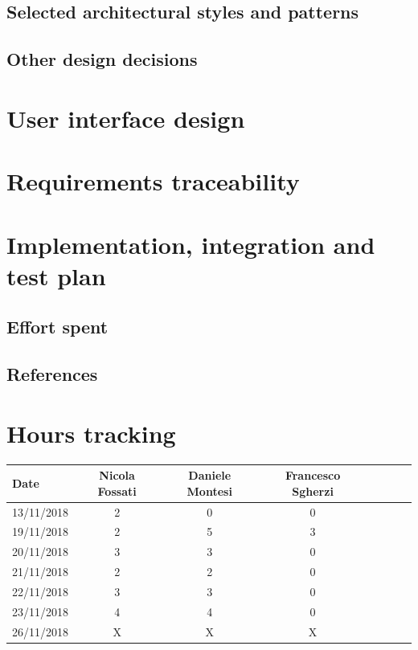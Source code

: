 \documentclass[a4paper,oneside,11pt]{article}
\begin{document}
        \subsection{Selected architectural styles and patterns}
            
        \subsection{Other design decisions}
            
        
    \newpage
    \section{User interface design}
        
    \newpage
    \section{Requirements traceability}
        
    \newpage
    \section{Implementation, integration and test plan}
        
    \newpage
    \subsection{Effort spent}
        
    \newpage
    \subsection{References}
        
        
    \section{Hours tracking}
        \begin{tabular}{l*{6}{c}r}
            Date & Nicola Fossati & Daniele Montesi & Francesco Sgherzi \\
            \hline
            13/11/2018 & 2 & 0 & 0   \\
            \hline
            19/11/2018 & 2 & 5 & 3   \\
            \hline
            20/11/2018 & 3 & 3 & 0   \\
            \hline
            21/11/2018 & 2 & 2 & 0   \\
            \hline
            22/11/2018 & 3 & 3 & 0   \\
            \hline
            23/11/2018 & 4 & 4 & 0   \\
            \hline
            26/11/2018 & X & X & X   \\
        \end{tabular}
\end{document}
